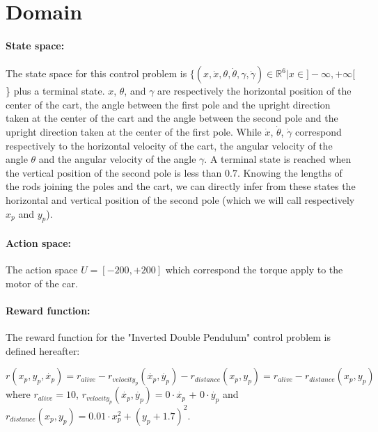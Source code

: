 
\usepackage{apacite}
\usepackage{algorithm}
\usepackage{algorithmic}




\section{Domain}

\paragraph{State space:} The state space for this control problem is $\{(x, \Dot{x}, \theta, \Dot{\theta}, \gamma, \Dot{\gamma}) \in \mathbb{R}^6|x \in ]-\infty, +\infty[$\} plus a terminal state. $x$, $\theta$, and $\gamma$ are respectively the horizontal position of the center of the cart, the angle between the first pole and the upright direction taken at the center of the cart and the angle between the second pole and the upright direction taken at the center of the first pole. While $\Dot{x}$, $\Dot{\theta}$, $\Dot{\gamma}$ correspond respectively to the horizontal velocity of the cart, the angular velocity of the angle $\theta$ and the angular velocity of the angle $\gamma$. A terminal state is reached when the vertical position of the second pole is less than $0.7$. Knowing the lengths of the rods joining the poles and the cart, we can directly infer from these states the horizontal and vertical position of the second pole (which we will call respectively $x_p$ and $y_p$).

\paragraph{Action space:} The action space $U = [-200,+200] $ which correspond the torque apply to the motor of the car.

\paragraph{Reward function:} The reward function for the "Inverted Double Pendulum" control problem is defined hereafter:

\begin{equation}
    r(x_p, y_p, \Dot{x_p}) = r_{alive} - r_{velocity_p}(\Dot{x_p}, \Dot{y_p}) - r_{distance}(x_p, y_p) = r_{alive} - r_{distance}(x_p, y_p)
\end{equation} where $r_{alive} = 10$, $r_{velocity_p}(\Dot{x_p},\Dot{y_p})  = 0 \cdot \Dot{x_p}$ + $0 \cdot \Dot{y_p}$ and  $r_{distance}(x_p, y_p) = 0.01 \cdot x_p^2 + (y_p + 1.7)^2$.

